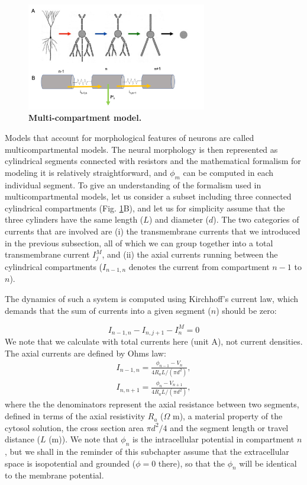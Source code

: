 \begin{figure}[!ht]
\begin{center}
\includegraphics[width=0.7\textwidth]{Fig02/Multikompis.png}
\end{center}
\caption{\textbf{Multi-compartment model.}
}
\label{fig:multikompisen}
\end{figure}

Models that account for morphological features of neurons are called multicompartmental models. The neural morphology is then represented as cylindrical segments connected with resistors and the mathematical formalism for modeling it is relatively straightforward, and $\phi_m$ can be computed in each individual segment. To give an understanding of the formalism used in multicompartmental models, let us consider a subset including three connected cylindrical compartments (Fig. \ref{fig:multikompisen}B), and let us for simplicity assume that the three cylinders have the same length ($L$) and diameter ($d$). The two categories of currents that are involved are (i) the transmembrane currents that we introduced in the previous subsection, all of which we can group together into a total transmembrane current $I^M_j$, and (ii) the axial currents running between the cylindrical compartments ($I_{n-1,n}$ denotes the current from compartment $n-1$ to $n$). 

The dynamics of such a system is computed using Kirchhoff's current law, which demands that the sum of currents into a given segment ($n$) should be zero:

\begin{equation}
I_{n-1,n} - I_{n,j+1} - I^M_n = 0
\label{eq:Kirch}
\end{equation}
We note that we calculate with total currents here (unit A), not current densities. The axial currents are defined by Ohms law:
\begin{eqnarray}
I_{n-1,n} = \frac{\phi_{n-1}-V_n}{4 R_a L/(\pi d^2)}, \nonumber \\ 
I_{n,n+1} = \frac{\phi_{n}-V_{n+1}}{4 R_a L/(\pi d^2)},
\label{eq:axialcurrents}
\end{eqnarray}
where the the denominators represent the axial resistance between two segments, defined in terms of the axial resistivity $R_a$ ($\Omega$ m), a material property of the cytosol solution, the cross section area $\pi d^2/4$ and the segment length or travel distance ($L$ (m)). We note that $\phi_n$ is the intracellular potential in compartment $n$, but we shall in the reminder of this subchapter assume that the extracellular space is isopotential and grounded ($\phi = 0$ there), so that the $\phi_n$ will be identical to the membrane potential.


